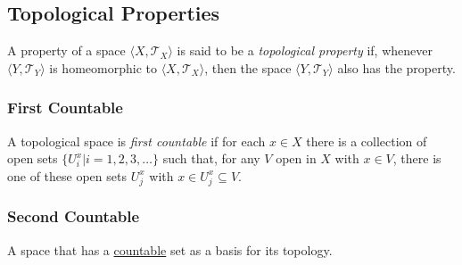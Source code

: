 \subsection{Topological Properties}\label{topologicalproperties}
A property of a space $\langle X,\mathcal{T}_X \rangle$ is said to be a \emph{topological property} if, whenever $\langle Y, \mathcal{T}_Y \rangle$ is homeomorphic to $\langle X,\mathcal{T}_X \rangle$, then the space $\langle Y,\mathcal{T}_Y \rangle$
also has the property.

\subsubsection{First Countable}\label{firstcountable}
A topological space is \emph{first countable} if for each $x \in X$ there is a collection of open sets $\{ U^x_i | i = 1,2,3,\dots \}$ such that,
for any $V$ open in $X$ with $x \in V$, there is one of these open sets $U^x_j$ with $x \in U^x_j \subseteq V$.

\subsubsection{Second Countable}\label{secondcountable}
A space that has a \hyperref[countable]{countable} set as a basis for its topology.